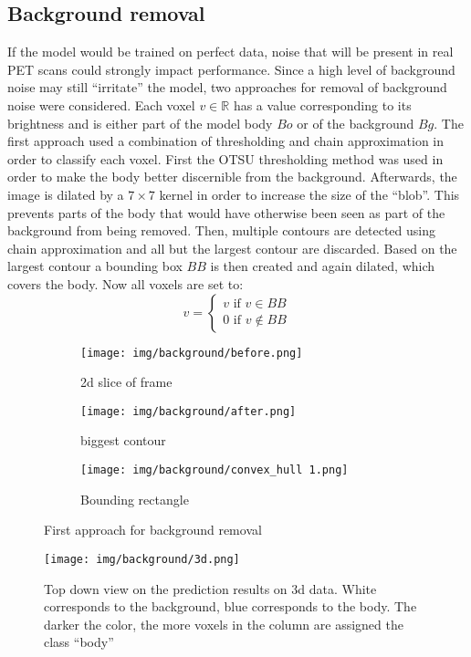 \subsection{Background removal}
\label{ss:bgremoval}
 If the model would be trained on perfect data, noise that will be present in real PET scans could strongly impact performance.
Since a high level of background noise may still \enquote{irritate} the model, two approaches for removal of background noise were considered.
Each voxel $v \in \mathbb{R}$ has a value corresponding to its brightness and is either part of the model body $Bo$ or of the background $Bg$.
 The first approach used a combination of thresholding and chain approximation in order to classify each voxel. First the OTSU thresholding method \cite{otsuThresholdSelectionMethod1979} was used in order to make the body better discernible from the background. Afterwards, the image is dilated by a $7\times 7$ kernel in order to increase the size of the \enquote{blob}. This prevents parts of the body that would have otherwise been seen as part of the background from being removed. Then, multiple contours are detected using chain approximation and all but the largest contour are discarded. Based on the largest contour a bounding box $BB$ is then created and again dilated, which covers the body. Now all voxels are set to:
 $$v=\begin{cases}
 	v \text{ if } v \in BB\\
 	0 \text{ if } v \notin BB
 \end{cases}$$
\begin{figure}
	\centering
	\begin{subfigure}[b]{0.3\textwidth}
		\centering
		\texttt{[image: img/background/before.png]}
		\caption{2d slice of frame}
		\label{fig:bgbefore}
	\end{subfigure}
	\hfill
	\begin{subfigure}[b]{0.3\textwidth}
		\centering
		\texttt{[image: img/background/after.png]}
		\caption{biggest contour}
		\label{fig:bgcontour}
	\end{subfigure}
	\hfill
	\begin{subfigure}[b]{0.3\textwidth}
		\centering
		\texttt{[image: img/background/convex\_hull 1.png]}
		\caption{Bounding rectangle}
		\label{fig:bgrect}
	\end{subfigure}
	\caption{First approach for background removal}
	\label{fig:bgremoval1}
\end{figure}
\begin{figure}
	\centering
	\texttt{[image: img/background/3d.png]}
	\caption{Top down view on the prediction results on 3d data. White corresponds to the background, blue corresponds to the body. The darker the color, the more voxels in the column are assigned the class \enquote{body}}
	\label{fig:background3d}
\end{figure}

